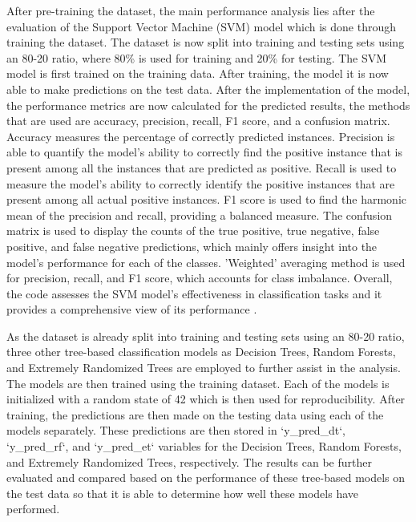 \documentclass[12pt]{article}
\begin{document}
After pre-training the dataset, the main performance analysis lies after the evaluation of the Support Vector Machine (SVM) model which is done through training the dataset. The dataset is now split into training and testing sets using an 80-20 ratio, where 80\% is used for training and 20\% for testing. The SVM model is first trained on the training data. After training, the model it is now able to make predictions on the test data. After the implementation of the model, the performance metrics are now calculated for the predicted results, the methods that are used are accuracy, precision, recall, F1 score, and a confusion matrix. Accuracy measures the percentage of correctly predicted instances. Precision is able to quantify the model's ability to correctly find the positive instance that is present among all the instances that are predicted as positive. Recall is used to measure the model's ability to correctly identify the positive instances that are present among all actual positive instances. F1 score is used to find the harmonic mean of the precision and recall, providing a balanced measure. The confusion matrix is used to display the counts of the true positive, true negative, false positive, and false negative predictions, which mainly offers insight into the model's performance for each of the classes. 'Weighted' averaging method is used for precision, recall, and F1 score, which accounts for class imbalance. Overall, the code assesses the SVM model's effectiveness in classification tasks and it provides a comprehensive view of its performance \citep{zhang2022startups}.

As the dataset is already split into training and testing sets using an 80-20 ratio, three other tree-based classification models as Decision Trees, Random Forests, and Extremely Randomized Trees are employed to further assist in the analysis. The models are then trained using the training dataset. Each of the models is initialized with a random state of 42 which is then used for reproducibility. After training, the predictions are then made on the testing data using each of the models separately. These predictions are then stored in `y\_pred\_dt`, `y\_pred\_rf`, and `y\_pred\_et` variables for the Decision Trees, Random Forests, and Extremely Randomized Trees, respectively. The results can be further evaluated and compared based on the performance of these tree-based models on the test data so that it is able to determine how well these models have performed.
\end{document}
